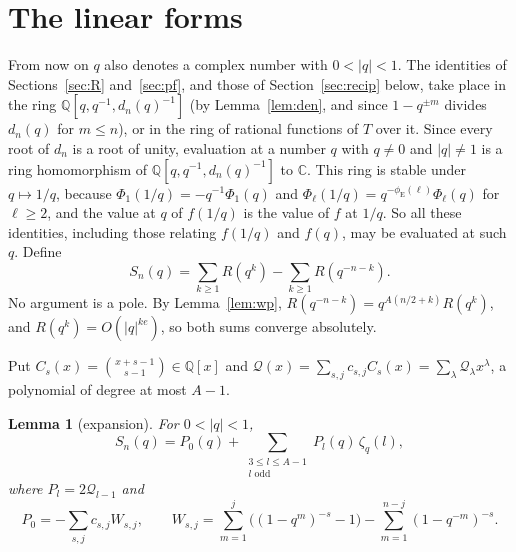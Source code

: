 \documentclass[11pt]{amsart}
\newtheorem{lemma}[theorem]{Lemma}
\theoremstyle{definition}
\theoremstyle{remark}
\numberwithin{equation}{section}
\newcommand{\QQ}{\mathbb{Q}}
\newcommand{\CC}{\mathbb{C}}
\newcommand{\eu}{\phi_{\mathrm E}}
\begin{document}
\section{The linear forms}\label{sec:forms}

From now on $q$ also denotes a complex number with $0<|q|<1$. The identities of Sections~\ref{sec:R}
and~\ref{sec:pf}, and those of Section~\ref{sec:recip} below, take place in the ring
$\QQ[q,q^{-1},d_n(q)^{-1}]$ (by Lemma~\ref{lem:den}, and since $1-q^{\pm m}$ divides $d_n(q)$ for $m\le n$), or in the
ring of rational functions of $T$ over it. Since every root of $d_n$ is a root of unity, evaluation at a number $q$ with
$q\ne0$ and $|q|\ne1$ is a ring homomorphism of $\QQ[q,q^{-1},d_n(q)^{-1}]$ to $\CC$. This ring is stable under
$q\mapsto1/q$, because $\Phi_1(1/q)=-q^{-1}\Phi_1(q)$ and $\Phi_\ell(1/q)=q^{-\eu(\ell)}\Phi_\ell(q)$ for $\ell\ge2$,
and the value at $q$ of $f(1/q)$ is the value of $f$ at $1/q$. So all these identities, including those relating
$f(1/q)$ and $f(q)$, may be
evaluated at such $q$. Define
\[
S_n(q)=\sum_{k\ge1}R(q^k)-\sum_{k\ge1}R(q^{-n-k}).
\]
No argument is a pole. By Lemma~\ref{lem:wp}, $R(q^{-n-k})=q^{A(n/2+k)}R(q^k)$, and $R(q^k)=O(|q|^{ke})$, so both
sums converge absolutely.

Put $C_s(x)=\binom{x+s-1}{s-1}\in\QQ[x]$ and $\mathcal Q(x)=\sum_{s,j}c_{s,j}C_s(x)=\sum_{\lambda}\mathcal
Q_\lambda x^\lambda$, a polynomial of degree at most $A-1$.

\begin{lemma}[expansion]\label{lem:expansion}
For $0<|q|<1$,
\[
S_n(q)=P_0(q)+\sum_{\substack{3\le l\le A-1\\ l\text{ odd}}}P_l(q)\,\zeta_q(l),
\]
where $P_l=2\mathcal Q_{l-1}$ and
\[
P_0=-\sum_{s,j}c_{s,j}W_{s,j},\qquad W_{s,j}=\sum_{m=1}^j\bigl((1-q^m)^{-s}-1\bigr)-\sum_{m=1}^{n-j}(1-q^{-m})^{-s}.
\]
\end{lemma}
\end{document}

